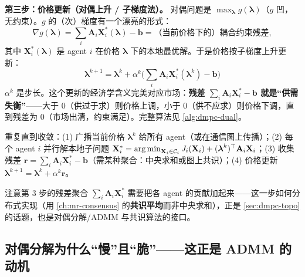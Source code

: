 \textbf{第三步：价格更新（对偶上升 / 子梯度法）。} 对偶问题是 $\max_{\boldsymbol{\lambda}}g(\boldsymbol{\lambda})$（$g$ 凹，无约束）。$g$ 的（次）梯度有一个漂亮的形式：
\begin{equation}
  \nabla g(\boldsymbol{\lambda}) = \sum_i \mathbf{A}_i\mathbf{X}_i^*(\boldsymbol{\lambda}) - \mathbf{b} = \text{（当前价格下的）耦合约束残差},
  \label{eq:dmpc-dualgrad}
\end{equation}
其中 $\mathbf{X}_i^*(\boldsymbol{\lambda})$ 是 agent $i$ 在价格 $\boldsymbol{\lambda}$ 下的本地最优解。于是价格按子梯度上升更新：
\begin{equation}
  \boxed{\ \boldsymbol{\lambda}^{k+1} = \boldsymbol{\lambda}^k + \alpha^k\Big(\sum_i \mathbf{A}_i\mathbf{X}_i^*(\boldsymbol{\lambda}^k)-\mathbf{b}\Big)\ }
  \label{eq:dmpc-price-update}
\end{equation}
$\alpha^k$ 是步长。这个更新的经济学含义完美对应市场：\textbf{残差 $\sum_i \mathbf{A}_i\mathbf{X}_i^*-\mathbf{b}$ 就是“供需失衡”}——大于 $0$（供过于求）则价格上调，小于 $0$（供不应求）则价格下调，直到残差为 $0$（市场出清，约束满足）。完整算法见 \cref{alg:dmpc-dual}。

\begin{algo}\label{alg:dmpc-dual}
重复直到收敛：(1) 广播当前价格 $\boldsymbol{\lambda}^k$ 给所有 agent（或在通信图上传播）；(2) 每个 agent $i$ 并行解本地子问题 $\mathbf{X}_i^*=\operatorname*{arg\,min}_{\mathbf{X}_i\in\mathcal{C}_i} J_i(\mathbf{X}_i)+(\boldsymbol{\lambda}^k)^\top \mathbf{A}_i\mathbf{X}_i$；(3) 收集残差 $\mathbf{r}=\sum_i \mathbf{A}_i\mathbf{X}_i^*-\mathbf{b}$（需某种聚合：中央求和或图上共识）；(4) 价格更新 $\boldsymbol{\lambda}^{k+1}=\boldsymbol{\lambda}^k+\alpha^k\mathbf{r}$。
\end{algo}

\noindent 注意第 $3$ 步的残差聚合 $\sum_i \mathbf{A}_i\mathbf{X}_i^*$ 需要把各 agent 的贡献加起来——这一步如何分布式实现（用 \cref{ch:mr-consensus} 的\textbf{共识平均}而非中央求和），正是 \cref{sec:dmpc-topo} 的话题，也是对偶分解/ADMM 与共识算法的接口。

\subsection{对偶分解为什么“慢”且“脆”——这正是 ADMM 的动机}
\label{sec:dmpc-dual-weak}

